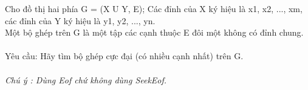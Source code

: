 Cho đồ thị hai phía G = (X U Y, E); Các đỉnh của X ký hiệu là x1, x2, ..., xm, các đỉnh của Y ký hiệu là y1, y2, ..., yn.   
\\   Một bộ ghép trên G là một tập các cạnh thuộc E đôi một không có đỉnh chung.   
\\
\\       Yêu cầu: Hãy tìm bộ ghép cực đại (có nhiều cạnh nhất) trên G.      
\\
\\\textit{    Chú ý : Dùng         Eof        chứ không dùng         SeekEof.       }